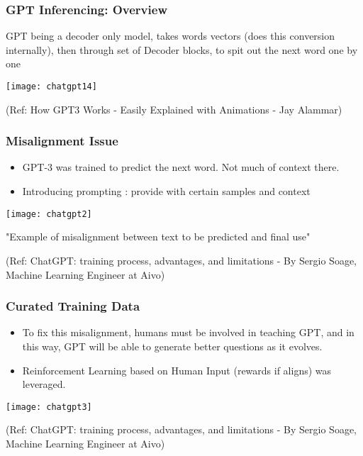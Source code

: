 \begin{frame}[fragile]\frametitle{GPT Inferencing: Overview}


GPT being a decoder only model, takes words vectors (does this conversion internally), then through set of Decoder blocks, to spit out the next word one by one

\begin{center}
\texttt{[image: chatgpt14]}
\end{center}		


{\tiny (Ref: How GPT3 Works - Easily Explained with Animations - Jay Alammar)}

\end{frame}

\begin{frame}[fragile]\frametitle{Misalignment Issue}


\begin{itemize}
\item GPT-3 was trained to predict the next word. Not much of context there.
\item Introducing prompting : provide with certain samples and context

\end{itemize}	 

			\begin{center}
			\texttt{[image: chatgpt2]}
			
			{\tiny "Example of misalignment between text to be predicted and final use"}
			\end{center}		
			
			
			{\tiny (Ref: ChatGPT: training process, advantages, and limitations - By Sergio Soage, Machine Learning Engineer at Aivo)}
			
\end{frame}

\begin{frame}[fragile]\frametitle{Curated Training Data}


\begin{itemize}
\item To fix this misalignment, humans must be involved in teaching GPT, and in this way, GPT will be able to generate better questions as it evolves.
\item Reinforcement Learning based on Human Input (rewards if aligns) was leveraged.
\end{itemize}	 

\begin{center}
\texttt{[image: chatgpt3]}

\end{center}		

{\tiny (Ref: ChatGPT: training process, advantages, and limitations - By Sergio Soage, Machine Learning Engineer at Aivo)}
			
\end{frame}


